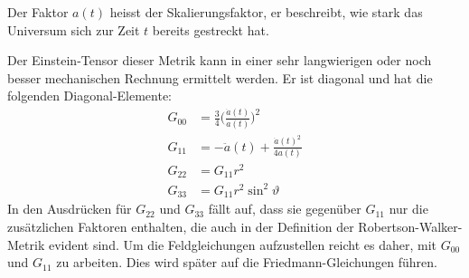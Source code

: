 Der Faktor $a(t)$ heisst der Skalierungsfaktor, er beschreibt, wie stark
das Universum sich zur Zeit $t$ bereits gestreckt hat.

Der Einstein-Tensor dieser Metrik kann in einer sehr langwierigen oder
noch besser mechanischen Rechnung ermittelt werden.
Er ist diagonal und hat die folgenden Diagonal-Elemente:
\begin{align*}
G_{00}
&=
\frac{3}{4}\biggl(\frac{\dot a(t)}{a(t)}\biggr)^2
\\
G_{11}
&=
-\ddot a(t) +\frac{\dot a(t)^2}{4a(t)}
\\
G_{22}
&=
G_{11} r^2
\\
G_{33}
&=
G_{11} r^2\sin^2\vartheta
\end{align*}
In den Ausdrücken für $G_{22}$ und $G_{33}$ fällt auf, dass sie gegenüber
$G_{11}$ nur die zusätzlichen Faktoren enthalten, die auch in der Definition
der Robertson-Walker-Metrik evident sind.
Um die Feldgleichungen aufzustellen reicht es daher, mit $G_{00}$ und
$G_{11}$ zu arbeiten.
Dies wird später auf die Friedmann-Gleichungen führen.



